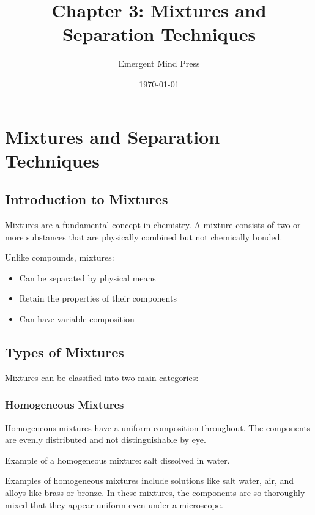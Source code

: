 \documentclass[justified,notoc]{tufte-book}
\title{Chapter 3: Mixtures and Separation Techniques}
\author{Emergent Mind Press}
\date{\today}
\newenvironment{keyconcept}[1]{%
    \begin{tcolorbox}[colback=primary!5,colframe=primary,title=\textbf{Key Concept: #1}]
}{%
    \end{tcolorbox}
}
\begin{document}
\maketitle

\chapter{Mixtures and Separation Techniques}

\section{Introduction to Mixtures}

Mixtures are a fundamental concept in chemistry. A mixture consists of two or more substances that are physically combined but not chemically bonded.

\begin{keyconcept}{Key Properties of Mixtures}
Unlike compounds, mixtures:
\begin{itemize}
    \item Can be separated by physical means
    \item Retain the properties of their components
    \item Can have variable composition
\end{itemize}
\end{keyconcept}

\FloatBarrier

\section{Types of Mixtures}

Mixtures can be classified into two main categories:

\subsection{Homogeneous Mixtures}

Homogeneous mixtures have a uniform composition throughout. The components are evenly distributed and not distinguishable by eye.

\begin{marginfigure}[0pt]
  \caption{Example of a homogeneous mixture: salt dissolved in water.}
  \label{fig:homogeneous}
\end{marginfigure}

Examples of homogeneous mixtures include solutions like salt water, air, and alloys like brass or bronze. In these mixtures, the components are so thoroughly mixed that they appear uniform even under a microscope.
\end{document}
